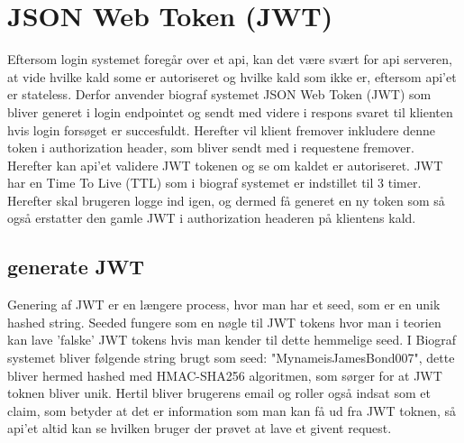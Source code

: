 ﻿\section{JSON Web Token (JWT)}
Eftersom login systemet foregår over et api, kan det være svært for api serveren, at vide hvilke kald some er autoriseret
og hvilke kald som ikke er, eftersom api'et er stateless. Derfor anvender biograf systemet JSON Web Token (JWT)
som bliver generet i login endpointet og sendt med videre i respons svaret til klienten hvis login forsøget er succesfuldt.
Herefter vil klient fremover inkludere denne token i authorization header, som bliver sendt med i requestene fremover.
Herefter kan api'et validere JWT tokenen og se om kaldet er autoriseret. JWT har en Time To Live (TTL) som i biograf systemet
er indstillet til 3 timer. Herefter skal brugeren logge ind igen, og dermed få generet en ny token som så også erstatter den
gamle JWT i authorization headeren på klientens kald.\\ 

\subsection{generate JWT}
Genering af JWT er en længere process, hvor man har et seed, som er en unik hashed string. Seeded fungere som en nøgle
til JWT tokens hvor man i teorien kan lave 'falske' JWT tokens hvis man kender til dette hemmelige seed. I Biograf systemet
bliver følgende string brugt som seed: "MynameisJamesBond007", dette bliver hermed hashed med HMAC-SHA256 algoritmen, 
som sørger for at JWT toknen bliver unik. Hertil bliver brugerens email og roller også indsat som et claim, som betyder
at det er information som man kan få ud fra JWT toknen, så api'et altid kan se hvilken bruger der prøvet at lave et givent
request.\\